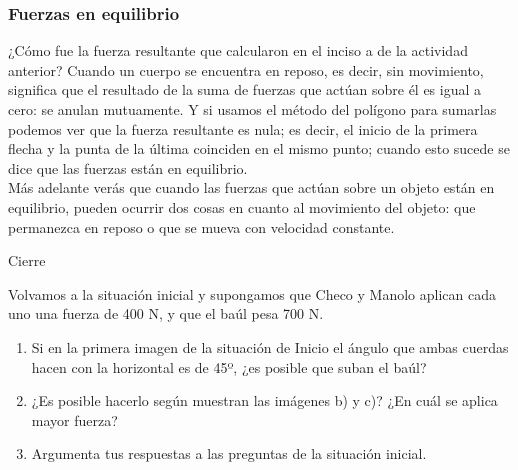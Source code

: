 \documentclass[11pt]{book}
\begin{document}
\subsubsection{Fuerzas en equilibrio}
¿Cómo fue la fuerza resultante que calcularon en el inciso a de la actividad anterior?
Cuando un cuerpo se encuentra en reposo, es decir, sin movimiento, significa que el
resultado de la suma de fuerzas que actúan sobre él es igual a cero: se anulan mutuamente.
Y si usamos el método del polígono para sumarlas podemos ver que la fuerza resultante es
nula; es decir, el inicio de la primera flecha y la punta de la última coinciden en el
mismo punto; cuando esto sucede se dice que las fuerzas están en equilibrio.\\

Más adelante verás que cuando las fuerzas que actúan sobre un objeto están en equilibrio,
pueden ocurrir dos cosas en cuanto al movimiento del objeto: que permanezca en reposo o
que se mueva con velocidad constante.\\

\begin{boxF}
  \begin{center}\color{colorrds}\large Cierre\end{center}

  Volvamos a la situación inicial y supongamos que Checo y Manolo aplican cada uno una
  fuerza de 400 N, y que el baúl pesa 700 N.
  \begin{enumerate}
    \item Si en la primera imagen de la situación de Inicio el ángulo que
          ambas cuerdas hacen con la horizontal es de 45º, ¿es posible que suban el baúl?
    \item ¿Es posible hacerlo según muestran las imágenes b) y c)?
          ¿En cuál se aplica mayor fuerza?
    \item Argumenta tus respuestas a las preguntas de la situación inicial.
  \end{enumerate}

\end{boxF}

\newpage
\end{document}
